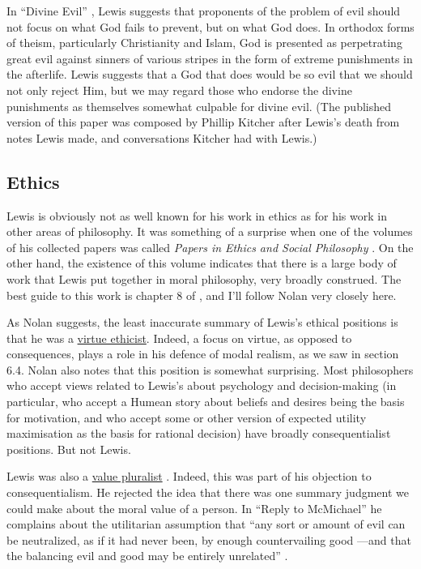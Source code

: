 In ``Divine Evil'' \citeyearpar{Lewis2007}, Lewis suggests that proponents of the problem of evil should not focus on what God fails to prevent, but on what God does. In orthodox forms of theism, particularly Christianity and Islam, God is presented as perpetrating great evil against sinners of various stripes in the form of extreme punishments in the afterlife. Lewis suggests that a God that does would be so evil that we should not only reject Him, but we may regard those who endorse the divine punishments as themselves somewhat culpable for divine evil. (The published version of this paper was composed by Phillip Kitcher after Lewis's death from notes Lewis made, and conversations Kitcher had with Lewis.)

\subsection{Ethics} 
Lewis is obviously not as well known for his work in ethics as for his work in other areas of philosophy. It was something of a surprise when one of the volumes of his collected papers was called \textit{Papers in Ethics and Social Philosophy} \citeyearpar{Lewis2000a}. On the other hand, the existence of this volume indicates that there is a large body of work that Lewis put together in moral philosophy, very broadly construed. The best guide to this work is chapter 8 of \citet{Nolan2005}, and I'll follow Nolan very closely here.

As Nolan suggests, the least inaccurate summary of Lewis's ethical positions is that he was a \href{http://plato.stanford.edu/ethics-virtue/}{virtue ethicist}. Indeed, a focus on virtue, as opposed to consequences, plays a role in his defence of modal realism, as we saw in section 6.4. Nolan also notes that this position is somewhat surprising. Most philosophers who accept views related to Lewis's about psychology and decision-making (in particular, who accept a Humean story about beliefs and desires being the basis for motivation, and who accept some or other version of expected utility maximisation as the basis for rational decision) have broadly consequentialist positions. But not Lewis.

Lewis was also a \href{http://plato.stanford.edu/value-pluralism/}{value pluralist} \citeyearpar{Lewis1984a, Lewis1989b, Lewis1993b}. Indeed, this was part of his objection to consequentialism. He rejected the idea that there was one summary judgment we could make about the moral value of a person. In ``Reply to McMichael'' \citeyearpar{Lewis1978a} he complains about the utilitarian assumption that ``any sort or amount of evil can be neutralized, as if it had never been, by enough countervailing good ---and that the balancing evil and good may be entirely unrelated'' \citeyearpar[85]{Lewis1978a}.


